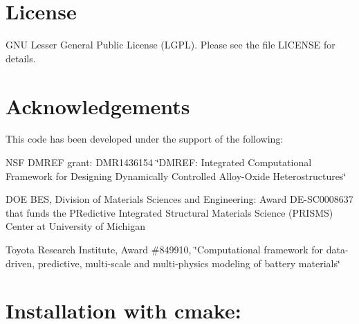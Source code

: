 \section*{{\bfseries License}~\newline
 }

G\+NU Lesser General Public License (L\+G\+PL). Please see the file L\+I\+C\+E\+N\+SE for details.

\section*{{\bfseries Acknowledgements}~\newline
 }

This code has been developed under the support of the following\+: ~\newline



\begin{DoxyItemize}
\item N\+SF D\+M\+R\+EF grant\+: D\+M\+R1436154 \char`\"{}\+D\+M\+R\+E\+F\+: Integrated Computational Framework for Designing Dynamically Controlled Alloy-\/\+Oxide Heterostructures\char`\"{} ~\newline

\item D\+OE B\+ES, Division of Materials Sciences and Engineering\+: Award DE-\/\+S\+C0008637 that funds the P\+Redictive Integrated Structural Materials Science (P\+R\+I\+S\+MS) Center at University of Michigan ~\newline

\item Toyota Research Institute, Award \#849910, \char`\"{}\+Computational framework for data-\/driven, predictive, multi-\/scale and multi-\/physics modeling of battery materials\char`\"{} ~\newline

\end{DoxyItemize}

\section*{{\bfseries Installation with cmake\+:}~\newline
 }


